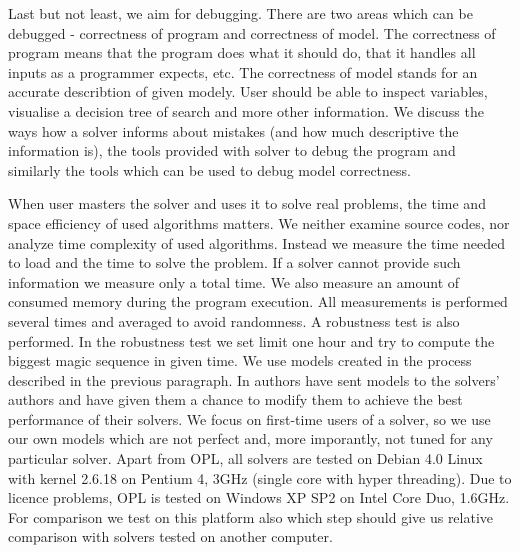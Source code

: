 Last but not least, we aim for debugging. There are two areas which can be 
debugged - correctness of program and correctness of model. The correctness of 
program means that the program does what it should do, that it handles all inputs as a programmer expects, etc. 
The correctness of model stands for an accurate describtion of given modely. User should be able to 
inspect variables, visualise a decision tree of search and more other information. 
We discuss the ways how a solver informs about mistakes (and how much descriptive the 
information is), the tools provided with solver to debug the program and similarly the 
tools which can be used to debug model correctness.

When user masters the solver and uses it to solve real problems, the time and space 
efficiency of used algorithms matters. We neither examine source codes, nor analyze 
time complexity of used algorithms. Instead we measure the time needed to 
load and the time to solve the problem. If a solver cannot provide such information 
we measure only a total time. We also measure an amount of consumed memory 
during the program execution. All measurements is performed several times 
and averaged to avoid randomness. A robustness test is also performed. 
In the robustness test we set limit one hour and try to compute the biggest magic 
sequence in given time. We use models created in the process described in the previous 
paragraph. In \cite{fernandez00} authors have sent models to the solvers' authors and 
have given them a chance to modify them to achieve the best performance of their solvers. 
We focus on first-time users of a solver, so we use our own models which are 
not perfect and, more imporantly, not tuned for any particular solver. Apart from OPL, all solvers 
are tested on Debian 4.0  Linux with kernel 2.6.18 on Pentium 4, 3GHz (single core 
with hyper threading). Due to licence problems, OPL is tested on Windows XP 
SP2 on Intel Core Duo, 1.6GHz. For comparison we test on this platform also 
\eclipse which step should give us relative comparison with solvers tested on another 
computer.